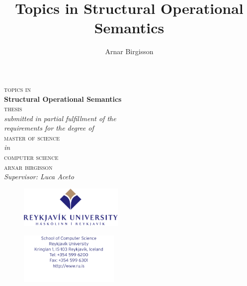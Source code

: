 \documentclass[10pt]{book}
\title{Topics in Structural Operational Semantics}
\author{Arnar Birgisson}
\let\spotcolor\relax
\theoremstyle{definition}
\theoremstyle{definition}
\begin{document}
\ifpdf
{}
\else
{}
\fi

\renewcommand{\chaptermark}[1]{\markboth{\upshape\scshape chapter \thechapter. \MakeLowercase{#1}}{}}
\renewcommand{\sectionmark}[1]{\markright{\upshape\scshape\MakeLowercase{#1}}{}}

\frontmatter{}

\begin{titlepage}
\setlength{\hoffset}{0mm}
\setlength{\oddsidemargin}{5mm}
\begin{center}
\vspace*{1cm}
{\fontsize{16}{24}\selectfont\spotcolor\scshape topics in} \\
\vspace*{.5cm}
{\fontsize{24}{50}\selectfont\spotcolor\bfseries
Structural Operational Semantics}\\
\vspace*{1.5cm}
\textsc{\large thesis}\\
\vspace*{.3cm}
\textit{submitted in partial fulfillment of the \\ 
requirements for the degree of }\\
\vspace*{.5cm}
\textsc{\large master of science}\\
\vspace*{.3cm}
\textit{in}\\
\vspace*{.3cm}
\textsc{\large computer science}\\
\vspace*{2.3cm}
\textsc{\LARGE arnar birgisson}\\
\vspace*{.2cm}
\textit{Supervisor: Luca Aceto}\\
\vspace*{1.7cm}
\begin{figure}[htbp]
    \centering
        \includegraphics[height=2cm]{RU-logo-EN.pdf}
\end{figure}
\begin{figure}[htbp]
    \centering
        \includegraphics[height=2.5cm,trim=0cm 1cm 0cm 0cm,clip]{CS-Address.pdf}
\end{figure}

\end{center}
\end{titlepage}
\end{document}
